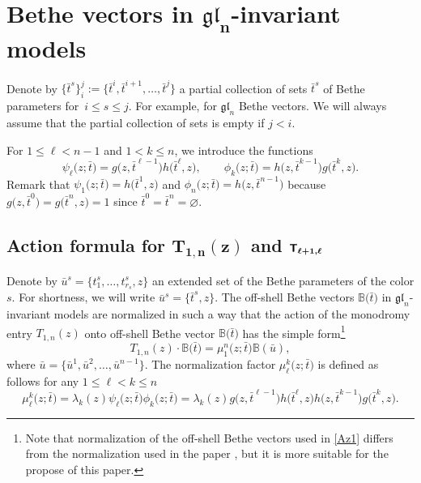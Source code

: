 \documentclass[pdftex]{sigma}
\newcommand{\bu}{\bar u}
\newcommand{\bt}{{\bar t}}
\theoremstyle{definition}
\def\BB{{\mathbb{B}}}
\def\r#1{\eqref{#1}}
\def\sT{{\sf T}}
\begin{document}
\section[Bethe vectors in gl\_n-invariant models]{Bethe vectors in $\boldsymbol{\mathfrak{gl}_n}$-invariant models}\label{sect:gln}

Denote by $\bigl\{\bt^s\bigr\}_i^{j}:=\bigl\{\bt^i,\bt^{i+1},\dots,\bt^{j}\bigr\}$
 a partial collection of sets $\bt^s$ of Bethe parameters
 for~$i\leq s\leq j$.
 For example, \smash{$\bt=\bigl\{\bt^s\bigr\}_1^{n-1}$} for $\mathfrak{gl}_n$ Bethe vectors.
We will always assume that the partial collection of sets
\smash{$\bigl\{\bt^s\bigr\}_i^{j}$} is empty if $j<i$.

For $1\leq \ell<n-1$ and $1<k\leq n$, we introduce the functions
\[%
\psi_\ell\bigl(z;\bt\bigr)=g\bigl(z,\bt^{\ell-1}\bigr) h\bigl(\bt^\ell,z\bigr),\qquad \phi_k\bigl(z;\bt\bigr)=
h\bigl(z,\bt^{k-1}\bigr) g\bigl(\bt^k,z\bigr) .
\]
Remark that $\psi_1\bigl(z;\bt\bigr)=h\bigl(\bt^1,z\bigr)$ and $\phi_n\bigl(z;\bt\bigr)=h\bigl(z,\bt^{n-1}\bigr)$
because $g\bigl(z,\bt^0\bigr)=g\bigl(\bt^n,z\bigr)= 1$ since $\bt^0=\bt^n = \varnothing$.

\subsection[Action formula for T\_1,n(z) and T\_l+1,l]{Action formula for $\boldsymbol{T_{1,n}(z)}$ and $\boldsymbol{\sT_{\ell+1,\ell}}$}

Denote by $\bu^s=\bigl\{t^s_1,\dots,t^s_{r_s},z\bigr\}$ an extended set of the Bethe parameters of the color $s$. For shortness, we will write $\bu^s=\bigl\{\bt^s,z\bigr\}$.
The off-shell Bethe vectors
$\BB\bigl(\bt\bigr)$ in $\mathfrak{gl}_n$-invariant models are normalized in such a way that
the action of the monodromy entry $T_{1,n}(z)$ onto off-shell Bethe vector
$\BB\bigl(\bt\bigr)$ has the simple form\footnote{Note that normalization of the
off-shell Bethe vectors used in \r{Az1} differs from the normalization used
in the paper \cite{HLPRS17b}, but it is more suitable for the propose of this paper.}
\begin{equation}\label{Az1}
T_{1,n}(z)\cdot \BB\bigl(\bt\bigr)=\mu_1^n\bigl(z;\bt\bigr) \BB(\bu) ,
\end{equation}
where $\bu=\bigl\{\bu^1,\bu^2,\dots,\bu^{n-1}\bigr\}$.
The normalization factor $\mu_\ell^k\bigl(z;\bt\bigr)$ is defined as follows
for any $1\leq \ell<k\leq n$
\begin{equation}\label{Az2}
\mu_\ell^k\bigl(z;\bt\bigr)=\lambda_k(z) \psi_\ell\bigl(z;\bt\bigr) \phi_k\bigl(z;\bt\bigr)=\lambda_k(z)
g\bigl(z,\bt^{\ell-1}\bigr) h\bigl(\bt^\ell,z\bigr) h\bigl(z,\bt^{k-1}\bigr) g\bigl(\bt^k,z\bigr) .
\end{equation}
\end{document}
